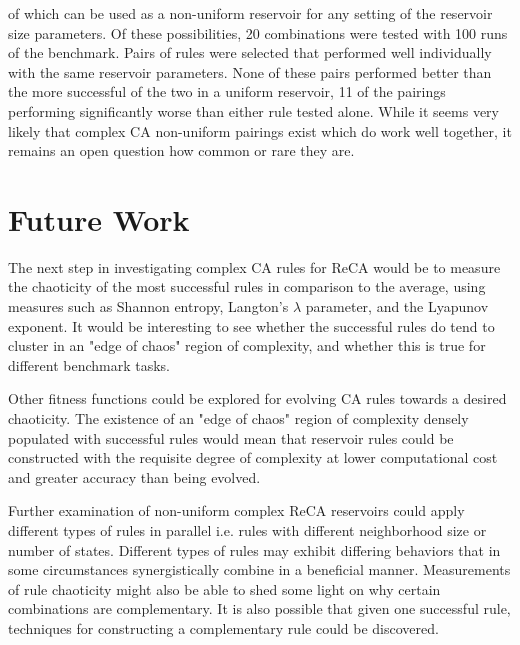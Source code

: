 \documentclass{facconf}
\begin{document}
\begin{multicols}{2}
        of which can be used as a non-uniform reservoir for  any setting of the 
        reservoir size parameters. Of these possibilities, 20 combinations were 
        tested with 100 runs of the benchmark. Pairs of rules were selected 
        that performed well individually with the same reservoir parameters.  
        None of these pairs performed better than the more successful of the 
        two in a uniform reservoir, 11 of the pairings performing significantly 
        worse than either rule tested alone. While it seems very likely that 
        complex CA non-uniform pairings exist which do work well together, it 
        remains an open question how common or rare they are.
 



\section{Future Work}\label{future_work}
The next step in investigating complex CA rules for ReCA would be to measure 
the chaoticity of the most successful rules in comparison to the average, using 
measures such as Shannon entropy, Langton's $\lambda$ parameter, and the 
Lyapunov exponent. It would be interesting to see whether the successful rules 
do tend to cluster in an "edge of chaos" region of complexity, and whether this
is true for different benchmark tasks. \par Other fitness functions could be 
explored for evolving CA rules towards a desired chaoticity. The existence of 
an "edge of chaos" region of complexity densely populated with successful rules 
would mean that reservoir rules could be constructed with the requisite degree 
of complexity at lower computational cost and greater accuracy than being 
evolved.  \par Further examination of non-uniform complex ReCA reservoirs could 
apply different types of rules in parallel i.e.  rules with different 
neighborhood size or number of states.  Different types of rules may exhibit 
differing behaviors that in some circumstances synergistically combine in a 
beneficial manner.  Measurements of rule chaoticity might also be able to shed 
some light on why certain combinations are complementary. It is also possible 
that given one successful rule, techniques for constructing a complementary 
rule could be discovered.



\end{multicols}
\end{document}
